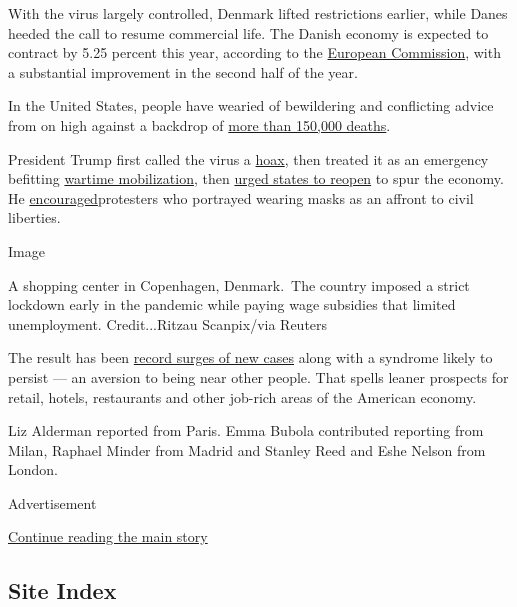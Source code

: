 With the virus largely controlled, Denmark lifted restrictions earlier,
while Danes heeded the call to resume commercial life. The Danish
economy is expected to contract by 5.25 percent this year, according to
the
\href{https://ec.europa.eu/economy_finance/forecasts/2020/summer/ecfin_forecast_summer_2020_dk_en.pdf}{European
Commission}, with a substantial improvement in the second half of the
year.

In the United States, people have wearied of bewildering and conflicting
advice from on high against a backdrop of
\href{https://www.nytimes3xbfgragh.onion/2020/07/29/us/coronavirus-deaths-150000.html}{more
than 150,000 deaths}.

President Trump first called the virus a
\href{https://www.nytimes3xbfgragh.onion/2020/02/28/us/politics/trump-accuses-media-democrats-coronavirus.html}{hoax},
then treated it as an emergency befitting
\href{https://www.nytimes3xbfgragh.onion/2020/03/22/us/politics/coronavirus-trump-wartime-president.html}{wartime
mobilization}, then
\href{https://www.nytimes3xbfgragh.onion/2020/04/16/us/politics/coronavirus-trump-guidelines.html}{urged
states to reopen} to spur the economy. He
\href{https://www.nytimes3xbfgragh.onion/2020/04/17/us/politics/trump-coronavirus-governors.html}{encouraged}protesters
who portrayed wearing masks as an affront to civil liberties.

Image

A shopping center in Copenhagen, Denmark.~The country imposed a strict
lockdown early in the pandemic while paying wage subsidies that limited
unemployment. Credit...Ritzau Scanpix/via Reuters

The result has been
\href{https://www.nytimes3xbfgragh.onion/2020/07/25/world/coronavirus-covid-19.html}{record
surges of new cases} along with a syndrome likely to persist --- an
aversion to being near other people. That spells leaner prospects for
retail, hotels, restaurants and other job-rich areas of the American
economy.

Liz Alderman reported from Paris. Emma Bubola contributed reporting from
Milan, Raphael Minder from Madrid and Stanley Reed and Eshe Nelson from
London.

Advertisement

\protect\hyperlink{after-bottom}{Continue reading the main story}

\hypertarget{site-index}{%
\subsection{Site Index}\label{site-index}}

